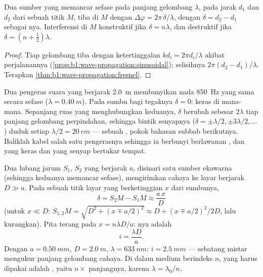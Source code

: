 \begin{proposition}\label{prop:b1:wave-propagation:pathdiff}
Dua sumber yang memancar sefase pada panjang gelombang $\lambda$, pada
jarak $d_1$ dan $d_2$ dari sebuah titik $M$, tiba di $M$ dengan
$\Delta\varphi = 2\pi\,\delta/\lambda$, dengan $\delta = d_2 - d_1$
sebagai \emph{}nya. Interferensi di $M$ konstruktif jika
$\delta = n\lambda$, dan destruktif jika $\delta = (n + \tfrac12)\lambda$.
\end{proposition}

\begin{proof}
Tiap gelombang tiba dengan ketertinggalan  $kd_i = 2\pi d_i/\lambda$
akibat perjalanannya (\cref{prop:b1:wave-propagation:sinusoidal});
selisihnya $2\pi(d_2 - d_1)/\lambda$. Terapkan
\cref{thm:b1:wave-propagation:fresnel}.
\end{proof}

\begin{example}\label{ex:b1:wave-propagation:speakers}
Dua pengeras suara yang berjarak \qty{2.0}{m} membunyikan nada
\qty{850}{Hz} yang sama secara sefase ($\lambda = \qty{0.40}{m}$). Pada
sumbu bagi tegaknya $\delta = 0$: keras di mana-mana. Sepanjang ruas
yang menghubungkan keduanya, $\delta$ berubah sebesar $2\lambda$ tiap
panjang gelombang perpindahan, sehingga bintik senyapnya
($\delta = \pm\lambda/2, \pm 3\lambda/2, \dots$) duduk setiap
$\lambda/2 = \qty{20}{cm}$ --- sebuah , pokok bahasan
subbab berikutnya. Baliklah kabel salah satu pengerasnya sehingga ia
berbunyi berlawanan , dan yang keras dan yang senyap bertukar tempat.
\end{example}

\begin{example}\label{ex:b1:wave-propagation:young}
Dua lubang jarum $S_1$, $S_2$ yang berjarak $a$, disinari satu sumber
ekawarna (sehingga keduanya memancar sefase), mengirimkan cahaya ke
layar berjarak $D \gg a$. Pada sebuah titik layar yang berketinggian $x$
dari sumbunya, 
\[
\delta = S_2M - S_1M \approx \frac{a\,x}{D}
\]
(untuk $x \ll D$: $S_{1,2}M = \sqrt{D^2 + (x \mp a/2)^2} \approx D +
(x \mp a/2)^2/2D$, lalu kurangkan). Pita terang pada $x = n\lambda D/a$:
\emph{}nya adalah
\[
i = \frac{\lambda D}{a} .
\]
Dengan $a = \qty{0.50}{mm}$, $D = \qty{2.0}{m}$, $\lambda = \qty{633}{nm}$:
$i = \qty{2.5}{mm}$ --- sebatang mistar mengukur panjang gelombang
cahaya. Di dalam medium berindeks $n$,  yang harus dipakai
adalah \emph{}, yaitu $n \times$ panjangnya, karena
$\lambda = \lambda_0/n$.
\end{example}

